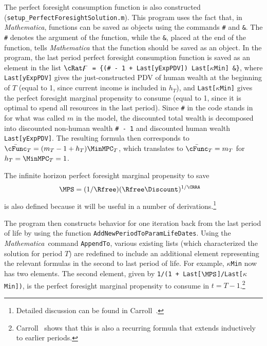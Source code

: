 \documentclass[titlepage]{\econtex}
\newcommand{\Mma}{\textit{Mathematica}}
\begin{document}
The perfect foresight consumption function is also constructed
(\texttt{setup\_PerfectForesightSolution.m}).  This program uses the
fact that, in {\Mma}, functions can be saved as objects using the
commands \texttt{\#} and \texttt{\&}. The \texttt{\#} denotes the
argument of the function, while the \texttt{\&}, placed at the end of
the function, tells {\Mma} that the function should be saved as an
object. In the program, the last period perfect foresight consumption
function is saved as an element in the list \texttt{$\cRat\digamma$ =
  \{(\# - 1 + Last[yExpPDV]) Last[$\kappa$Min] \&\}}, where
\texttt{Last[yExpPDV]} gives the just-constructed PDV of human wealth
at the beginning of $T$ (equal to 1, since current income is included
in $h_{T}$), and \texttt{Last[$\kappa$Min]} gives the perfect
foresight marginal propensity to consume (equal to 1, since it is
optimal to spend all resources in the last period). Since \texttt{\#}
in the code stands in for what was called $m$ in the model, the
discounted total wealth is decomposed into discounted non-human wealth
\texttt{\# - 1} and discounted human wealth
\texttt{Last[yExpPDV]}. The resulting formula then corresponds to
$\bar{\cFunc}_{T} = (m_{T}-1+{h}_{T})\MinMPC_{T}$, which translates to
$\bar{\cFunc}_{T} = m_{T}$ for ${h}_{T}=\MinMPC_{T}=1$.

The infinite horizon perfect foresight marginal propensity to save 
\begin{equation}\begin{gathered}\begin{aligned}
  \MPS  & = (1/\Rfree)(\Rfree \Discount)^{1/\CRRA} \label{eq:lambdadefn}
\end{aligned}\end{gathered}\end{equation}
is also defined because it will be useful in a number of derivations.\footnote{Detailed discussion can
  be found in Carroll~\citeyearpar{BufferStockTheory}.}

The program then constructs behavior for one iteration back from the
last period of life by using the function
\texttt{AddNewPeriodToParamLifeDates}.  Using the {\Mma}~command
\texttt{AppendTo}, various existing lists (which characterized the
solution for period $T$) are redefined to include an additional
element representing the relevant formulas in the second to last
period of life. For example, \texttt{$\kappa$Min} now has two
elements.  The second element, given by \texttt{1/(1 +
  Last[$\MPS$]/Last[$\kappa$Min])}, is the perfect foresight marginal
propensity to consume in $t=T-1$.\footnote{Carroll~\citeyearpar{BufferStockTheory} shows that this is also a
  recurring formula that extends inductively to earlier periods.}
\end{document}
